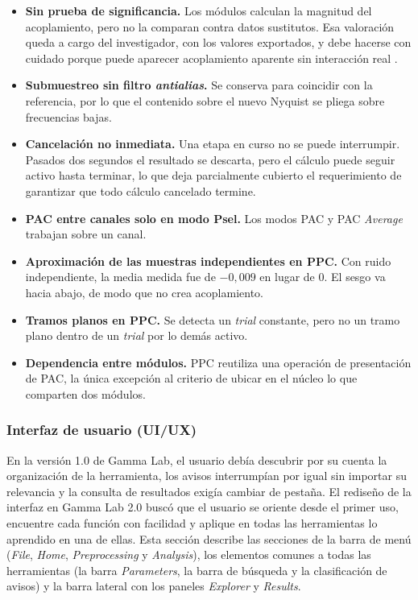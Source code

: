 \documentclass[12pt,letterpaper,oneside]{article}
\begin{document}
\begin{itemize}
  \item \textbf{Sin prueba de significancia.} Los módulos calculan la magnitud del acoplamiento, pero no la comparan contra datos sustitutos. Esa valoración queda a cargo del investigador, con los valores exportados, y debe hacerse con cuidado porque puede aparecer acoplamiento aparente sin interacción real \cite{aru2015}.
  \item \textbf{Submuestreo sin filtro \textit{antialias}.} Se conserva para coincidir con la referencia, por lo que el contenido sobre el nuevo Nyquist se pliega sobre frecuencias bajas.
  \item \textbf{Cancelación no inmediata.} Una etapa en curso no se puede interrumpir. Pasados dos segundos el resultado se descarta, pero el cálculo puede seguir activo hasta terminar, lo que deja parcialmente cubierto el requerimiento de garantizar que todo cálculo cancelado termine.
  \item \textbf{PAC entre canales solo en modo Psel.} Los modos PAC y PAC \textit{Average} trabajan sobre un canal.
  \item \textbf{Aproximación de las muestras independientes en PPC.} Con ruido independiente, la media medida fue de $-0{,}009$ en lugar de 0. El sesgo va hacia abajo, de modo que no crea acoplamiento.
  \item \textbf{Tramos planos en PPC.} Se detecta un \textit{trial} constante, pero no un tramo plano dentro de un \textit{trial} por lo demás activo.
  \item \textbf{Dependencia entre módulos.} PPC reutiliza una operación de presentación de PAC, la única excepción al criterio de ubicar en el núcleo lo que comparten dos módulos.
\end{itemize}

\subsubsection{Interfaz de usuario (UI/UX)}

En la versión 1.0 de Gamma Lab, el usuario debía descubrir por su cuenta la organización de la herramienta, los avisos interrumpían por igual sin importar su relevancia y la consulta de resultados exigía cambiar de pestaña. El rediseño de la interfaz en Gamma Lab 2.0 buscó que el usuario se oriente desde el primer uso, encuentre cada función con facilidad y aplique en todas las herramientas lo aprendido en una de ellas. Esta sección describe las secciones de la barra de menú (\textit{File}, \textit{Home}, \textit{Preprocessing} y \textit{Analysis}), los elementos comunes a todas las herramientas (la barra \textit{Parameters}, la barra de búsqueda y la clasificación de avisos) y la barra lateral con los paneles \textit{Explorer} y \textit{Results}.
\end{document}
